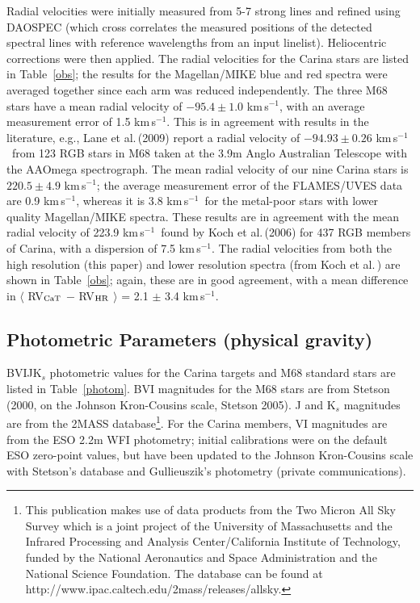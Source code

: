 \documentclass{emulateapj}
\newcommand\kms{km\,s$^{-1}$}
\newcommand\etal{{\rm et al.\,}}
\begin{document}
Radial velocities were initially measured from 5-7 strong 
lines and refined using DAOSPEC (which cross correlates 
the measured positions of the detected spectral lines
with reference wavelengths from an input linelist).
Heliocentric corrections were then applied.   The radial
velocities for the Carina stars are listed in Table~\ref{obs};
the results for the Magellan/MIKE blue and red spectra were 
averaged together since each arm was reduced independently.
The three M68 stars have a mean radial velocity of 
$-95.4 \pm 1.0$ \kms, with an average measurement error
of 1.5 \kms.     This is in agreement with results in
the literature, e.g., Lane \etal (2009) report a radial velocity
of  $-94.93 \pm 0.26$ \kms\ from 123 RGB stars in M68 taken 
at the 3.9m Anglo Australian Telescope with the AAOmega
spectrograph.
%
The mean radial velocity of our nine Carina stars is 
$220.5 \pm 4.9$ \kms; the average measurement error of
the FLAMES/UVES data are 0.9 \kms, whereas it is 
3.8 \kms\ for the metal-poor stars with lower 
quality Magellan/MIKE spectra. 
These results are in agreement with the mean radial
velocity of 223.9 \kms\ found by Koch \etal (2006) for 
437 RGB members of Carina, with a dispersion of 7.5 \kms.
%
The radial velocities from both the high resolution
(this paper) and lower resolution spectra (from 
Koch \etal) are shown in Table~\ref{obs}; again, these are 
in good agreement, with a mean difference in 
$\langle$ RV$_{\rm CaT}$ $-$ RV$_{\rm HR}$ $\rangle$ = 2.1 $\pm$ 3.4 \kms.



\subsection {Photometric Parameters (physical gravity) \label{photometry}}

BVIJK$_{s}$ photometric values for the Carina targets and 
M68 standard stars are listed in Table~\ref{photom}.  
%
BVI magnitudes for the M68 stars are from Stetson 
(2000, on the Johnson Kron-Cousins scale,
Stetson 2005).  J and K$_{s}$ magnitudes are from 
the 2MASS database\footnote{This publication makes use
of data products from the Two Micron All Sky Survey which is a
joint project of the University of Massachusetts and the Infrared
Processing and Analysis Center/California Institute of Technology,
funded by the National Aeronautics and Space Administration and
the National Science Foundation.   The database can be found at
http://www.ipac.caltech.edu/2mass/releases/allsky.}.
% 
For the Carina members, VI magnitudes are from the ESO 2.2m WFI
photometry; initial calibrations were on the default ESO zero-point
values, but have been updated to the Johnson Kron-Cousins scale with
Stetson's database and Gullieuszik's photometry (private communications).   
\end{document}
